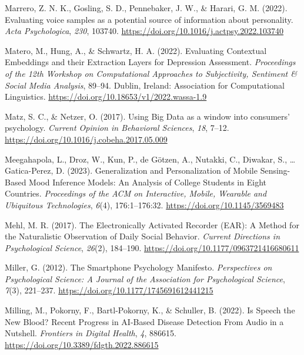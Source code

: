 \documentclass[
  english,
  man,floatsintext]{apa6}
\newlength{\cslhangindent}
\newenvironment{CSLReferences}[2] %
 {%
  \setlength{\parindent}{0pt}
  \ifodd #1 \everypar{\setlength{\hangindent}{\cslhangindent}}\ignorespaces\fi
  \ifnum #2 > 0
  \setlength{\parskip}{#2\baselineskip}
  \fi
 }%
 {}
\begin{document}
\begin{CSLReferences}{1}{0}
\leavevmode{}%
Marrero, Z. N. K., Gosling, S. D., Pennebaker, J. W., \& Harari, G. M. (2022). Evaluating voice samples as a potential source of information about personality. \emph{Acta Psychologica}, \emph{230}, 103740. \url{https://doi.org/10.1016/j.actpsy.2022.103740}

\leavevmode{}%
Matero, M., Hung, A., \& Schwartz, H. A. (2022). Evaluating {Contextual Embeddings} and their {Extraction Layers} for {Depression Assessment}. \emph{Proceedings of the 12th {Workshop} on {Computational Approaches} to {Subjectivity}, {Sentiment} \& {Social Media Analysis}}, 89--94. Dublin, Ireland: Association for Computational Linguistics. \url{https://doi.org/10.18653/v1/2022.wassa-1.9}

\leavevmode{}%
Matz, S. C., \& Netzer, O. (2017). Using {Big Data} as a window into consumers' psychology. \emph{Current Opinion in Behavioral Sciences}, \emph{18}, 7--12. \url{https://doi.org/10.1016/j.cobeha.2017.05.009}

\leavevmode{}%
Meegahapola, L., Droz, W., Kun, P., de Götzen, A., Nutakki, C., Diwakar, S., \ldots{} Gatica-Perez, D. (2023). Generalization and {Personalization} of {Mobile Sensing-Based Mood Inference Models}: {An Analysis} of {College Students} in {Eight Countries}. \emph{Proceedings of the ACM on Interactive, Mobile, Wearable and Ubiquitous Technologies}, \emph{6}(4), 176:1--176:32. \url{https://doi.org/10.1145/3569483}

\leavevmode{}%
Mehl, M. R. (2017). The {Electronically Activated Recorder} ({EAR}): {A Method} for the {Naturalistic Observation} of {Daily Social Behavior}. \emph{Current Directions in Psychological Science}, \emph{26}(2), 184--190. \url{https://doi.org/10.1177/0963721416680611}

\leavevmode{}%
Miller, G. (2012). The {Smartphone Psychology Manifesto}. \emph{Perspectives on Psychological Science: A Journal of the Association for Psychological Science}, \emph{7}(3), 221--237. \url{https://doi.org/10.1177/1745691612441215}

\leavevmode{}%
Milling, M., Pokorny, F., Bartl-Pokorny, K., \& Schuller, B. (2022). Is {Speech} the {New Blood}? {Recent Progress} in {AI-Based Disease Detection From Audio} in a {Nutshell}. \emph{Frontiers in Digital Health}, \emph{4}, 886615. \url{https://doi.org/10.3389/fdgth.2022.886615}


\end{CSLReferences}
\end{document}
